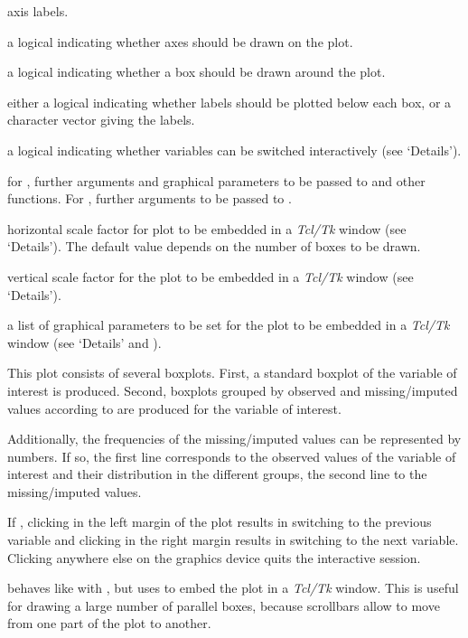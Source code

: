 \begin{Arguments}
\begin{ldescription}
\item[\code{xlab, ylab}] axis labels.
\item[\code{axes}] a logical indicating whether axes should be drawn 
on the plot.
\item[\code{frame.plot}] a logical indicating whether a box should be drawn 
around the plot.
\item[\code{labels}] either a logical indicating whether labels should be 
plotted below each box, or a character vector giving the labels.
\item[\code{interactive}] a logical indicating whether variables can be 
switched interactively (see `Details').
\item[\code{...}] for , further arguments and graphical parameters 
to be passed to  and other functions.  
For , further arguments to be passed to .
\item[\code{hscale}] horizontal scale factor for plot to be embedded in a 
\emph{Tcl/Tk} window (see `Details').  The default value 
depends on the number of boxes to be drawn.
\item[\code{vscale}] vertical scale factor for the plot to be embedded in a 
\emph{Tcl/Tk} window (see `Details').
\item[\code{TKRpar}] a list of graphical parameters to be set for the plot 
to be embedded in a \emph{Tcl/Tk} window (see `Details' and 
).
\end{ldescription}
\end{Arguments}
%
\begin{Details}\relax
This plot consists of several boxplots. First, a standard boxplot of the 
variable of interest is produced. Second, boxplots grouped by observed and 
missing/imputed values according to  are produced for the variable 
of interest.

Additionally, the frequencies of the missing/imputed values can be represented 
by numbers.  If so, the first line corresponds to the observed values of 
the variable of interest and their distribution in the different groups, 
the second line to the missing/imputed values.

If , clicking in the left margin of the plot 
results in switching to the previous variable and clicking in the right 
margin results in switching to the next variable.  Clicking anywhere 
else on the graphics device quits the interactive session.

 behaves like  with , 
but uses  to embed the plot in a 
\emph{Tcl/Tk} window.  This is useful for drawing a large number of 
parallel boxes, because scrollbars allow to move from one part of the 
plot to another. 
\end{Details}
